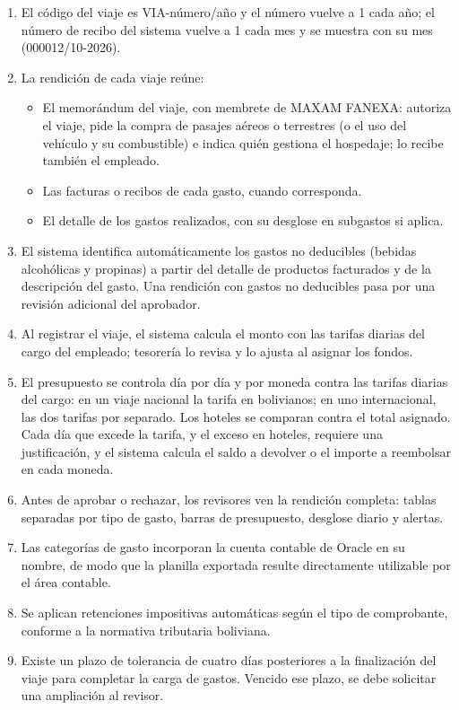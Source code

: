 \documentclass[11pt,letterpaper]{article}
\begin{document}
\begin{enumerate}
  \item El código del viaje es VIA-número/año y el número vuelve a 1 cada año; el número de recibo del sistema vuelve a 1 cada mes y se muestra con su mes (000012/10-2026).
  \item La rendición de cada viaje reúne:
  \begin{itemize}
    \item El memorándum del viaje, con membrete de MAXAM FANEXA: autoriza el viaje, pide la compra de pasajes aéreos o terrestres (o el uso del vehículo y su combustible) e indica quién gestiona el hospedaje; lo recibe también el empleado.
    \item Las facturas o recibos de cada gasto, cuando corresponda.
    \item El detalle de los gastos realizados, con su desglose en subgastos si aplica.
  \end{itemize}
  \item El sistema identifica automáticamente los gastos no deducibles (bebidas alcohólicas y propinas) a partir del detalle de productos facturados y de la descripción del gasto. Una rendición con gastos no deducibles pasa por una revisión adicional del aprobador.
  \item Al registrar el viaje, el sistema calcula el monto con las tarifas diarias del cargo del empleado; tesorería lo revisa y lo ajusta al asignar los fondos.
  \item El presupuesto se controla día por día y por moneda contra las tarifas diarias del cargo: en un viaje nacional la tarifa en bolivianos; en uno internacional, las dos tarifas por separado. Los hoteles se comparan contra el total asignado. Cada día que excede la tarifa, y el exceso en hoteles, requiere una justificación, y el sistema calcula el saldo a devolver o el importe a reembolsar en cada moneda.
  \item Antes de aprobar o rechazar, los revisores ven la rendición completa: tablas separadas por tipo de gasto, barras de presupuesto, desglose diario y alertas.
  \item Las categorías de gasto incorporan la cuenta contable de Oracle en su nombre, de modo que la planilla exportada resulte directamente utilizable por el área contable.
  \item Se aplican retenciones impositivas automáticas según el tipo de comprobante, conforme a la normativa tributaria boliviana.
  \item Existe un plazo de tolerancia de cuatro días posteriores a la finalización del viaje para completar la carga de gastos. Vencido ese plazo, se debe solicitar una ampliación al revisor.

\end{enumerate}
\end{document}

